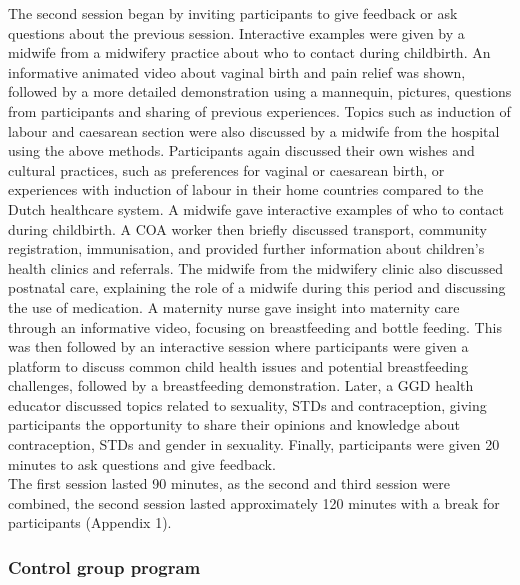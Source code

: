 \documentclass[12pt]{article}
\begin{document}
\noindent The second session began by inviting participants to give feedback or ask questions about the previous session. Interactive examples were given by a midwife from a midwifery practice about who to contact during childbirth. An informative animated video about vaginal birth and pain relief was shown, followed by a more detailed demonstration using a mannequin, pictures, questions from participants and sharing of previous experiences. Topics such as induction of labour and caesarean section were also discussed by a midwife from the hospital using the above methods. Participants again discussed their own wishes and cultural practices, such as preferences for vaginal or caesarean birth, or experiences with induction of labour in their home countries compared to the Dutch healthcare system. A midwife gave interactive examples of who to contact during childbirth. A COA worker then briefly discussed transport, community registration, immunisation, and provided further information about children's health clinics and referrals. The midwife from the midwifery clinic also discussed postnatal care, explaining the role of a midwife during this period and discussing the use of medication. A maternity nurse gave insight into maternity care through an informative video, focusing on breastfeeding and bottle feeding. This was then followed by an interactive session where participants were given a platform to discuss common child health issues and potential breastfeeding challenges, followed by a breastfeeding demonstration. Later, a GGD health educator discussed topics related to sexuality, STDs and contraception, giving participants the opportunity to share their opinions and knowledge about contraception, STDs and gender in sexuality. Finally, participants were given 20 minutes to ask questions and give feedback. \\

\noindent The first session lasted 90 minutes, as the second and third session were combined, the second session lasted approximately 120 minutes with a break for participants (Appendix 1).

\subsubsection{Control group program}
\end{document}
